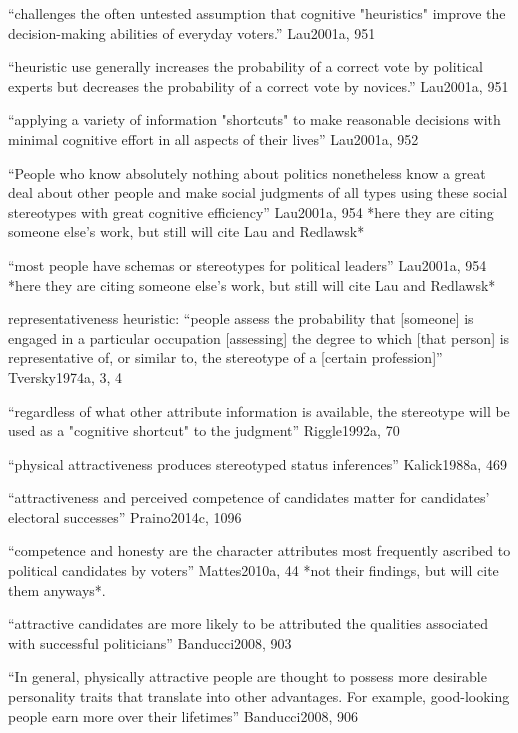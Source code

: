		``challenges the often untested assumption that cognitive "heuristics" improve the decision-making abilities of everyday voters.'' Lau2001a, 951

		``heuristic use generally increases the probability of a correct vote by political experts but decreases the probability of a correct vote by novices.'' Lau2001a, 951

		``applying a variety of information "shortcuts" to make reasonable decisions with minimal cognitive effort in all aspects of their lives'' Lau2001a, 952


	
	

		``People who know absolutely nothing about politics nonetheless know a great deal about other people and make social judgments of all types using these social stereotypes with great cognitive efficiency'' Lau2001a, 954 *here they are citing someone else's work, but still will cite Lau and Redlawsk*

		``most people have schemas or stereotypes for political leaders'' Lau2001a, 954 *here they are citing someone else's work, but still will cite Lau and Redlawsk*

		representativeness heuristic: ``people assess the probability that [someone] is engaged in a particular occupation [assessing] the degree to which [that person] is representative of, or similar to, the stereotype of a [certain profession]'' Tversky1974a, 3, 4

		``regardless of what other attribute information is available, the stereotype will be used as a "cognitive shortcut" to the judgment'' Riggle1992a, 70

		``physical attractiveness produces stereotyped status inferences'' Kalick1988a, 469

		``attractiveness and perceived competence of candidates matter for candidates’ electoral successes'' Praino2014c, 1096



		``competence and honesty are the character attributes most frequently ascribed to political candidates by voters'' Mattes2010a, 44 *not their findings, but will cite them anyways*.	

		``attractive candidates are more likely to be attributed the qualities associated with successful politicians'' Banducci2008, 903

		``In general, physically attractive people are thought to possess more desirable personality traits that translate into other advantages. For example, good-looking people earn more over their lifetimes'' Banducci2008, 906

